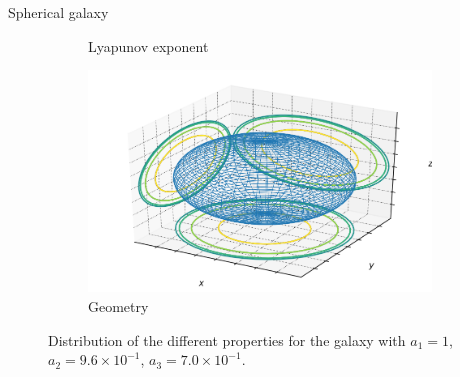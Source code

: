 \documentclass[handout]{beamer}
\begin{document}
\begin{frame}{Spherical galaxy}
\begin{figure}[h]
\begin{subfigure}[t]{0.35\textwidth}
			\caption{Lyapunov exponent}
		\end{subfigure}
		\begin{subfigure}[t]{0.35\textwidth}
			\includegraphics[width=\textwidth]{"../Files/Week 13/images/10_ellipsoid"}
			\caption{Geometry}
		\end{subfigure}
		\caption{Distribution of the different properties for the galaxy with $a_1 = 1$, $a_2 = 9.6\times10^{-1}$, $a_3 = 7.0\times10^{-1}$.}
	\end{figure}
\end{frame}
\end{document}
